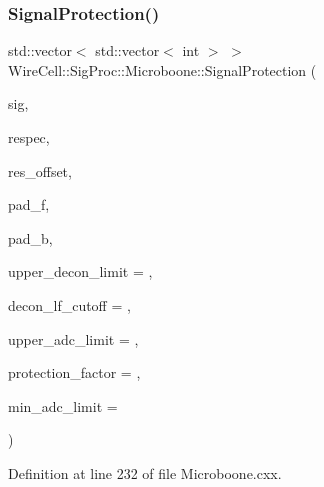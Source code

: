 \subsubsection{\texorpdfstring{Signal\+Protection()}{SignalProtection()}}
{\footnotesize\ttfamily std\+::vector$<$ std\+::vector$<$ int $>$ $>$ Wire\+Cell\+::\+Sig\+Proc\+::\+Microboone\+::\+Signal\+Protection (\begin{DoxyParamCaption}\item[{\hyperlink{namespace_wire_cell_1_1_waveform_a479175e541c8545e87cd8063b74b6956}{Wire\+Cell\+::\+Waveform\+::realseq\+\_\+t} \&}]{sig,  }\item[{const \hyperlink{namespace_wire_cell_1_1_waveform_a7e4a8d371f774438bb360e7d1dcb583a}{Wire\+Cell\+::\+Waveform\+::compseq\+\_\+t} \&}]{respec,  }\item[{int}]{res\+\_\+offset,  }\item[{int}]{pad\+\_\+f,  }\item[{int}]{pad\+\_\+b,  }\item[{float}]{upper\+\_\+decon\+\_\+limit = {},  }\item[{float}]{decon\+\_\+lf\+\_\+cutoff = {},  }\item[{float}]{upper\+\_\+adc\+\_\+limit = {},  }\item[{float}]{protection\+\_\+factor = {},  }\item[{float}]{min\+\_\+adc\+\_\+limit = {} }\end{DoxyParamCaption})}



Definition at line 232 of file Microboone.\+cxx.

